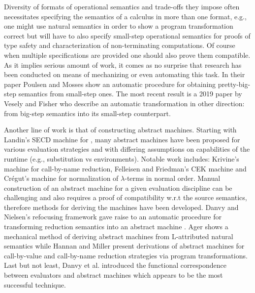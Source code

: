 Diversity of formats of operational semantics and trade-offs they impose often necessitates specifying the semantics of a calculus in more than one format, e.g., one might use natural semantics in order to show a program transformation correct but will have to also specify small-step operational semantics for proofs of type safety and characterization of non-terminating computations.
Of course when multiple specifications are provided one should also prove them compatible.
As it implies serious amount of work, it comes as no surprise that research has been conducted on means of mechanizing or even automating this task.
In their paper \cite{poulsen-deriving-pretty-big-step} Poulsen and Mosses show an automatic procedure for obtaining pretty-big-step semantics from small-step ones.
The most recent result is a 2019 paper by Vesely and Fisher \cite{one-step-at-a-time} who describe an automatic transformation in other direction: from big-step semantics into its small-step counterpart.

Another line of work is that of constructing abstract machines.
Starting with Landin's SECD machine \cite{landin-secd} for \LC{}, many abstract machines have been proposed for various evaluation strategies and with differing assumptions on capabilities of the runtime (e.g., substitution vs environments).
Notable work includes: Krivine's machine \cite{krivine-machine} for call-by-name reduction, Felleisen and Friedman's CEK machine \cite{felleisen-cek} and Cr\'{e}gut's machine \cite{cregut-normal} for normalization of $\lambda$-terms in normal order.
Manual construction of an abstract machine for a given evaluation discipline can be challenging and also requires a proof of compatibility w.r.t the source semantics, therefore methods for deriving the machines have been developed.
Danvy and Nielsen's refocusing framework \cite{refocusing} gave raise to an automatic procedure for transforming reduction semantics into an abstract machine \cite{refocusing-auto,refocusing-generalized}.
Ager shows a mechanical method of deriving abstract machines from L-attributed natural semantics \cite{ager-natural-semantics} while Hannan and Miller present derivations of abstract machines for call-by-value and call-by-name reduction strategies \cite{hannan-big-step-to-am} via program transformations.
Last but not least, Danvy et al. introduced the functional correspondence between evaluators and abstract machines \cite{functional-correspondence} which appears to be the most successful technique.


